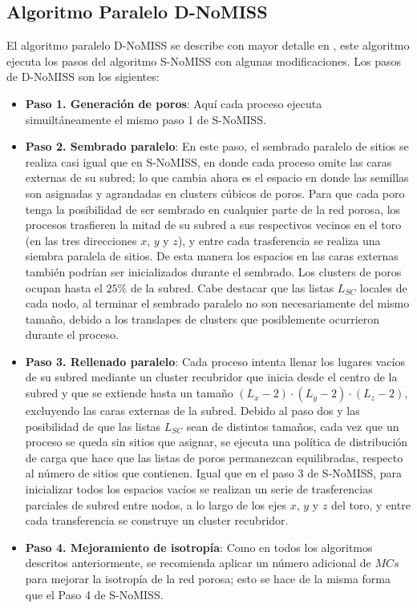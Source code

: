 \subsection{Algoritmo Paralelo D-NoMISS}
\label{subsubsec:pd-nomiss}
El algoritmo paralelo D-NoMISS se describe con mayor detalle en \cite{ref4}, este algoritmo ejecuta los pasos del algoritmo S-NoMISS 
con algunas modificaciones. Los pasos de D-NoMISS son los sigientes:

\begin{itemize}
\item[] \textbf{Paso 1. Generación de poros}: Aquí cada proceso ejecuta simuilt\'aneamente el mismo paso 1 de S-NoMISS.

\item[] \textbf{Paso 2. Sembrado paralelo}: En este paso, el sembrado paralelo de sitios se realiza casi igual que en S-NoMISS, en donde
cada proceso omite las caras externas de su subred; lo que cambia ahora es el espacio en donde las semillas son asignadas y agrandadas en
clusters c\'ubicos de poros. Para que cada poro tenga la
posibilidad de ser sembrado en cualquier parte de la red porosa, los procesos trasfieren la mitad de su subred a sus respectivos vecinos 
en el toro (en las tres direcciones $x$, $y$ y $z$), y entre cada trasferencia se realiza una siembra paralela de sitios. De esta manera 
los espacios en las caras externas tambi\'en podr\'ian ser inicializados durante el sembrado.
Los clusters de poros ocupan hasta el $25\%$ de la subred. Cabe destacar que las listas $L_{SC}$ locales de cada nodo, al terminar el
sembrado paralelo no son necesariamente del mismo tamaño, debido a los translapes de clusters que posiblemente ocurrieron durante el proceso.

\item[] \textbf{Paso 3. Rellenado paralelo}: Cada proceso intenta llenar los lugares vacíos de su subred mediante un cluster recubridor que 
inicia desde el centro de la subred y que se 
extiende hasta un tamaño $(L_x -2) \cdot (L_y - 2) \cdot (L_z -2)$, excluyendo las caras externas de la subred. Debido al paso dos y 
las posibilidad de que las listas $L_{SC}$ sean de distintos tamaños, cada vez que un proceso se queda sin sitios que asignar, se 
ejecuta una política de distribución de carga que hace que las listas de poros permanezcan equilibradas, respecto al n\'umero de sitios que 
contienen. Igual que en el paso 3 de S-NoMISS, para inicializar todos los espacios vac\'ios se realizan un serie de trasferencias parciales de 
subred entre nodos, a lo largo de los ejes $x$, $y$ y $z$ del toro, y entre cada transferencia se construye un cluster recubridor.

\item[] \textbf{Paso 4. Mejoramiento de isotrop\'ia}: Como en todos los algoritmos descritos anteriormente, se recomienda aplicar un 
número adicional de $MCs$ para mejorar la isotropía de la red porosa; esto se hace de la misma forma que el Paso 4 de S-NoMISS.\\
\end{itemize}

